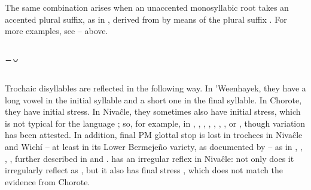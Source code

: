 The same combination arises when an unaccented monosyllabic root takes an accented plural suffix, as in , derived from  by means of the plural suffix . For more examples, see -- above.

\subsection{¯˘} \label{larga-corta}

Trochaic disyllables are reflected in the following way. In ’Weenhayek, they have a long vowel in the initial syllable and a short one in the final syllable. In Chorote, they have initial stress. In Nivaĉle, they sometimes also have initial stress, which is not typical for the language \citep{AnG15}; so, for example, in  \citep[267]{AnG15}, , , , , ,  , or  \citep[34]{LC20}, though variation has been attested. In addition, final PM glottal stop is lost in trochees in Nivaĉle and Wichí -- at least in its Lower Bermejeño variety, as documented by \citet{VN14} -- as in , , , , further described in  and .  has an irregular reflex in Nivaĉle: not only does it irregularly reflect  as , but it also has final stress , which does not match the evidence from Chorote.

